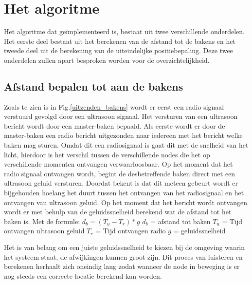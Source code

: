 \documentclass{article}
\begin{document}
\section{Het algoritme}
Het algoritme dat ge\"{i}mplementeerd is, bestaat uit twee verschillende onderdelen. Het eerste deel bestaat uit het berekenen van de afstand tot de bakens en het tweede deel uit de berekening van de uiteindelijke positiebepaling. Deze twee onderdelen zullen apart besproken worden voor de overzichtelijkheid.
	
\subsection{Afstand bepalen tot aan de bakens}
	Zoals te zien is in Fig.\ref{uitzenden_bakens} wordt er eerst een radio signaal verstuurd gevolgd door een ultrasoon signaal. Het versturen van een ultrasoon bericht wordt door een master-baken bepaald. Als eerste wordt er door de master-baken een radio bericht uitgezonden naar iedereen met het bericht welke baken mag sturen. Omdat dit een radiosignaal is gaat dit met de snelheid van het licht, hierdoor is het verschil tussen de verschillende nodes die het op verschillende momenten ontvangen verwaarloosbaar. Op het moment dat het radio signaal ontvangen wordt, begint de desbetreffende baken direct met een ultrasoon geluid versturen. Doordat bekent is dat dit meteen gebeurt wordt er bijgehouden hoelang het duurt tussen het ontvangen van het radiosignaal en het ontvangen van ultrasoon geluid. Op het moment dat het bericht wordt ontvangen wordt er met behulp van de geluidssnelheid berekend wat de afstand tot het baken is. Met de formule:\newline
	$ d_b = (T_u- T_r) * g $
	\newline\newline
	$ d_b$ = afstand tot baken\newline
	$T_u$ = Tijd ontvangen ultrasoon geluid\newline
	$T_r$ = Tijd ontvangen radio\newline
	$g$ = geluidssnelheid\newline
	
	Het is van belang om een juiste geluidssnelheid te kiezen bij de omgeving waarin het systeem staat, de afwijkingen kunnen groot zijn. Dit proces van luisteren en berekenen herhaalt zich oneindig lang zodat wanneer de node in beweging is er nog steeds een correcte locatie berekend kan worden. 
	
\end{document}
